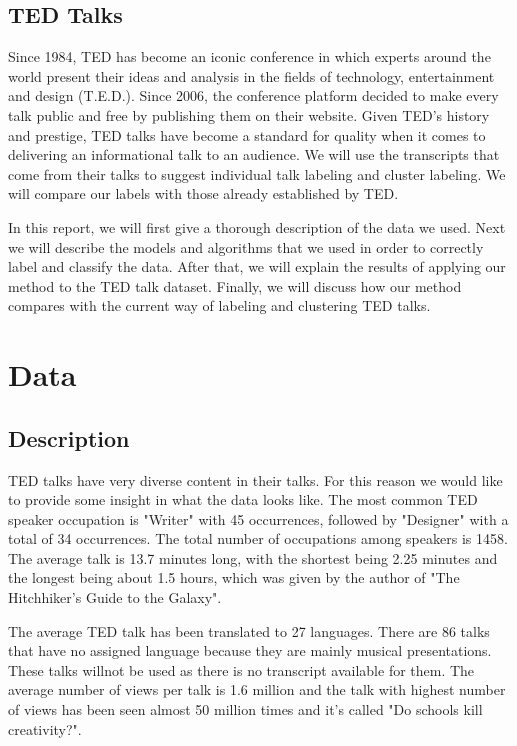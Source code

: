 \documentclass[letterpaper, 11pt]{article}
\begin{document}
\subsection{TED Talks}\label{ted-talks}

Since 1984, TED has become an iconic conference in which experts around the world present their ideas and analysis in the fields
of technology, entertainment and design (T.E.D.). Since 2006, the
conference platform decided to make every talk public and free by
publishing them on their website. Given TED's history and prestige, TED
talks have become a standard for quality when it comes to delivering an
informational talk to an audience. We will use the transcripts that come
from their talks to suggest individual talk labeling and cluster
labeling. We will compare our labels with those already established by TED.

In this report, we will first give a thorough description of the data we used. Next we will describe the models and algorithms that we used in order to correctly label and classify the data. After that, we will explain the results of applying our method to the TED talk dataset. Finally, we will discuss how our method compares with the current way of labeling and clustering TED talks.

\section{Data}\label{data}

\subsection{Description}\label{description}

TED talks have very diverse content in their talks. For this reason we
would like to provide some insight in what the data looks like. The most
common TED speaker occupation is "Writer" with 45 occurrences, followed
by "Designer" with a total of 34 occurrences. The total number of
occupations among speakers is 1458. The average talk is 13.7 minutes
long, with the shortest being 2.25 minutes and the longest being about
1.5 hours, which was given by the author of "The Hitchhiker's Guide to
the Galaxy". 

The average TED talk has been translated to 27 languages. There are 86 talks that have no assigned language because they are mainly musical presentations. These talks willnot be used as there is no transcript available for them. The average number of views per talk is 1.6 million and the talk with highest number of views has been seen almost 50 million times and it's called "Do schools kill creativity?".
\end{document}
